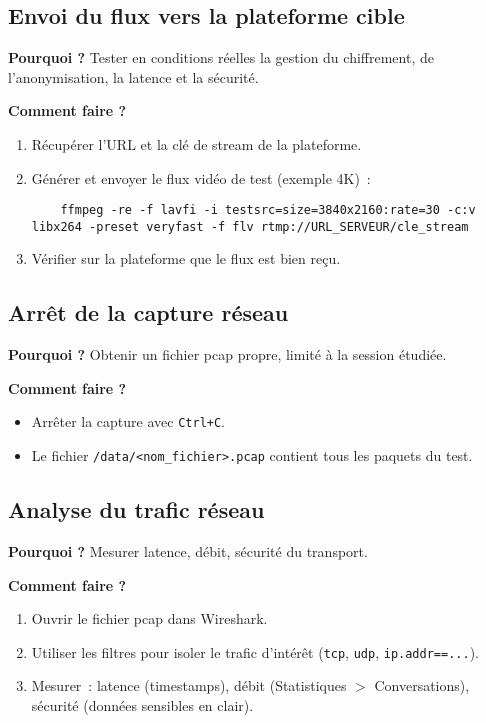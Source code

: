 \documentclass[a4paper,12pt]{article}
\begin{document}
\subsection{Envoi du flux vers la plateforme cible}
\textbf{Pourquoi ?} Tester en conditions réelles la gestion du chiffrement, de l’anonymisation, la latence et la sécurité.

\textbf{Comment faire ?}
\begin{enumerate}[label=\alph*)]
    \item Récupérer l’URL et la clé de stream de la plateforme.
    \item Générer et envoyer le flux vidéo de test (exemple 4K) :
    \begin{verbatim}
    ffmpeg -re -f lavfi -i testsrc=size=3840x2160:rate=30 -c:v libx264 -preset veryfast -f flv rtmp://URL_SERVEUR/cle_stream
    \end{verbatim}
    \item Vérifier sur la plateforme que le flux est bien reçu.
\end{enumerate}

\subsection{Arrêt de la capture réseau}
\textbf{Pourquoi ?} Obtenir un fichier pcap propre, limité à la session étudiée.

\textbf{Comment faire ?}
\begin{itemize}
    \item Arrêter la capture avec \texttt{Ctrl+C}.
    \item Le fichier \texttt{/data/<nom\_fichier>.pcap} contient tous les paquets du test.
\end{itemize}

\subsection{Analyse du trafic réseau}
\textbf{Pourquoi ?} Mesurer latence, débit, sécurité du transport.

\textbf{Comment faire ?}
\begin{enumerate}[label=\alph*)]
    \item Ouvrir le fichier pcap dans Wireshark.
    \item Utiliser les filtres pour isoler le trafic d’intérêt (\texttt{tcp}, \texttt{udp}, \texttt{ip.addr==...}).
    \item Mesurer : latence (timestamps), débit (Statistiques $>$ Conversations), sécurité (données sensibles en clair).
\end{enumerate}
\end{document}
